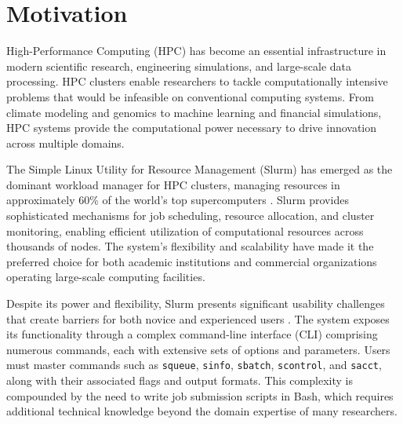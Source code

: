 \section{Motivation}
\label{sec:motivation}

High-Performance Computing (HPC) has become an essential infrastructure in modern scientific research, engineering simulations, and large-scale data processing. HPC clusters enable researchers to tackle computationally intensive problems that would be infeasible on conventional computing systems. From climate modeling and genomics to machine learning and financial simulations, HPC systems provide the computational power necessary to drive innovation across multiple domains.

The Simple Linux Utility for Resource Management (Slurm) has emerged as the dominant workload manager for HPC clusters, managing resources in approximately 60\% of the world's top supercomputers \cite{yoo2003slurm, slurm2024docs}. Slurm provides sophisticated mechanisms for job scheduling, resource allocation, and cluster monitoring, enabling efficient utilization of computational resources across thousands of nodes. The system's flexibility and scalability have made it the preferred choice for both academic institutions and commercial organizations operating large-scale computing facilities.

Despite its power and flexibility, Slurm presents significant usability challenges that create barriers for both novice and experienced users \cite{sabin2020hpc}. The system exposes its functionality through a complex command-line interface (CLI) comprising numerous commands, each with extensive sets of options and parameters. Users must master commands such as \texttt{squeue}, \texttt{sinfo}, \texttt{sbatch}, \texttt{scontrol}, and \texttt{sacct}, along with their associated flags and output formats. This complexity is compounded by the need to write job submission scripts in Bash, which requires additional technical knowledge beyond the domain expertise of many researchers.


